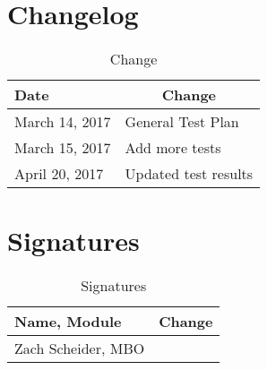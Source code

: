 \documentclass[]{article}
\begin{document}
\section{Changelog}

\begin{table}[H]
	\centering
	\caption{Change}
	\label{changelogl}
	\begin{tabular}{|l|l|}
		\hline
		Date & \multicolumn{1}{c|}{Change} \\ \hline
		March 14, 2017 & General Test Plan \\ \hline
		March 15, 2017 & Add more tests \\ \hline
		April 20, 2017 & Updated test results \\ \hline
	\end{tabular}
\end{table}

\section{Signatures}

\begin{table}[H]
	\centering
	\caption{Signatures}
	\label{signatures}
	\begin{tabular}{|l|l|}
		\hline
		Name, Module & \multicolumn{1}{c|}{Change} \\ \hline
		Zach Scheider, MBO & \\ \hline
	\end{tabular}
\end{table}
\end{document}
